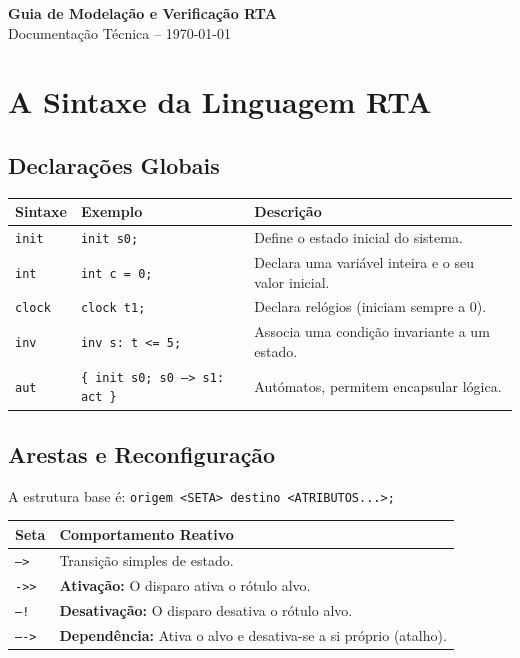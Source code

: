 \documentclass[a4paper,11pt]{article}
\begin{document}
\begin{center}
    {\huge \textbf{Guia de Modelação e Verificação RTA}} \\
    \vspace{2mm}
    {\large Documentação Técnica -- \today}
\end{center}



\section{A Sintaxe da Linguagem RTA}

\subsection{Declarações Globais}
\begin{table}[h]
\centering\small
\renewcommand{\arraystretch}{1.2}
\begin{tabularx}{\textwidth}{l l X}
\toprule
\textbf{Sintaxe} & \textbf{Exemplo} & \textbf{Descrição} \\ \midrule
\texttt{init} & \texttt{init s0;} & Define o estado inicial do sistema. \\
\texttt{int} & \texttt{int c = 0;} & Declara uma variável inteira e o seu valor inicial. \\
\texttt{clock} & \texttt{clock t1;} & Declara relógios (iniciam sempre a 0). \\
\texttt{inv} & \texttt{inv s: t <= 5;} & Associa uma condição invariante a um estado. \\
\texttt{aut} & \texttt{\{ init s0; s0 --> s1: act \}} & Autómatos, permitem encapsular lógica. \\  \bottomrule
\end{tabularx}
\end{table}

\subsection{Arestas e Reconfiguração}
A estrutura base é: \texttt{origem <SETA> destino <ATRIBUTOS...>;}
\begin{table}[h]
\centering\small
\renewcommand{\arraystretch}{1.2}
\begin{tabularx}{\textwidth}{l X}
\toprule
\textbf{Seta} & \textbf{Comportamento Reativo} \\ \midrule
\texttt{-->} & Transição simples de estado. \\
\texttt{->>} & \textbf{Ativação:} O disparo ativa o rótulo alvo. \\
\texttt{--!} & \textbf{Desativação:} O disparo desativa o rótulo alvo. \\
\texttt{----> } & \textbf{Dependência:} Ativa o alvo e desativa-se a si próprio (atalho). \\ \bottomrule
\end{tabularx}
\end{table}
\end{document}
